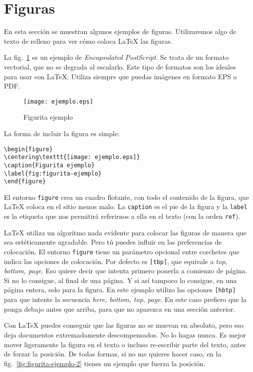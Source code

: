 \section{Figuras}
\label{sec:figuras}

En esta sección se muestran algunos ejemplos de figuras.  Utilizaremos algo de texto de relleno para ver cómo coloca \LaTeX{} las figuras.

La fig.~\ref{fig:figurita-ejemplo} es un ejemplo de \emph{Encapsulated PostScript}.  Se trata de un formato vectorial, que no se degrada al escalarlo.  Este tipo de formatos son los ideales para usar con \LaTeX{}.  Utiliza siempre que puedas imágenes en formato EPS o PDF.

\begin{figure}[hbtp]
\centering
\texttt{[image: ejemplo.eps]}
\caption{Figurita ejemplo}
\label{fig:figurita-ejemplo}
\end{figure}

La forma de incluir la figura es simple:

\begin{verbatim}
\begin{figure}
\centering\texttt{[image: ejemplo.eps]}
\caption{Figurita ejemplo}
\label{fig:figurita-ejemplo}
\end{figure}
\end{verbatim}

El entorno \texttt{figure} crea un cuadro flotante, con todo el contenido de la figura, que \LaTeX{} coloca en el sitio menos malo.  La \texttt{caption} es el pie de la figura y la \texttt{label} es la etiqueta que nos permitirá referirnos a ella en el texto (con la orden \texttt{ref}).

\LaTeX{} utiliza un algoritmo nada evidente para colocar las figuras de manera que sea estéticamente agradable.  Pero tú puedes influir en las preferencias de colocación.  El entorno \texttt{figure} tiene un parámetro opcional entre corchetes que indica las opciones de colocación.  Por defecto es \texttt{[tbp]}, que equivale a \emph{top, bottom, page}.  Eso quiere decir que intenta primero ponerla a comienzo de página.  Si no lo consigue, al final de una página.  Y si así tampoco lo consigue, en una página entera, solo para la figura.  En este ejemplo utilizo las opciones \texttt{[hbtp]} para que intente la secuencia \emph{here, bottom, top, page}.  En este caso prefiero que la ponga debajo antes que arriba, para que no aparezca en una sección anterior.

Con \LaTeX{} puedes conseguir que las figuras no se muevan en absoluto, pero eso deja documentos extremadamente descompensados.  No lo hagas nunca.  Es mejor mover ligeramente la figura en el texto o incluso re-escribir parte del texto, antes de forzar la posición.  De todas formas, si no me quieres hacer caso, en la fig.~\ref{fig:figurita-ejemplo-2}  tienes un ejemplo que fuerza la posición.

